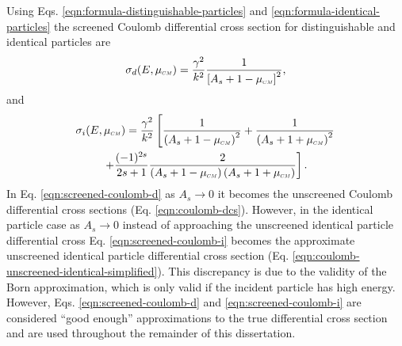 Using Eqs. \eqref{eqn:formula-distinguishable-particles} and \eqref{eqn:formula-identical-particles} the screened Coulomb differential cross section for distinguishable and identical particles are
\begin{equation} \label{eqn:screened-coulomb-d}
    \sigma_{d}(E,\mucm) = \dfrac{\gamma^2}{k^2} \dfrac{1}{\left[A_s + 1 - \mucm\right]^2},
\end{equation}
and
\begin{multline} \label{eqn:screened-coulomb-i}
    \sigma_{i}(E,\mucm) = \dfrac{\gamma^2}{k^2} \left[ \dfrac{1}{\left(A_s + 1 - \mucm\right)^2} + \dfrac{1}{\left(A_s + 1 + \mucm\right)^2} \right. \\ \left. + \dfrac{(-1)^{2s}}{2s+1} \dfrac{2}{\left(A_s + 1 - \mucm\right)\left(A_s + 1 + \mucm\right) }\right].
\end{multline}
In Eq. \eqref{eqn:screened-coulomb-d} as $A_s \rightarrow 0$ it becomes the unscreened Coulomb differential cross sections (Eq. \eqref{eqn:coulomb-dcs}). However, in the identical particle case as $A_s \rightarrow 0$ instead of approaching the unscreened identical particle differential cross Eq. \eqref{eqn:screened-coulomb-i} becomes the approximate unscreened identical particle differential cross section (Eq. \eqref{eqn:coulomb-unscreened-identical-simplified}). This discrepancy is due to the validity of the Born approximation, which is only valid if the incident particle has high energy. However, Eqs. \eqref{eqn:screened-coulomb-d} and \eqref{eqn:screened-coulomb-i} are considered ``good enough'' approximations to the true differential cross section and are used throughout the remainder of this dissertation. 


